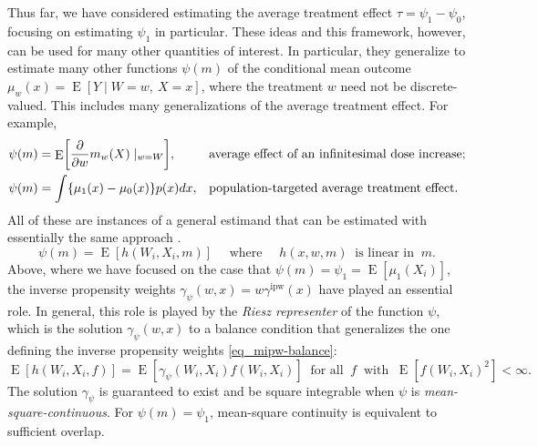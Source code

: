 \documentclass{article}
\DeclarePairedDelimiter\sqb{[}{]}
\theoremstyle{definition}
\DeclareMathOperator{\E}{E}
\newcommand{\ipw}{\text{ipw}}
\newcommand{\estimand}{\psi}
\newcommand{\gammaipw}{\ensuremath{\gamma^{\ipw}}}
\newcommand{\<}{\langle}
\renewcommand{\>}{\rangle}
\begin{document}
Thus far, we have considered estimating the average treatment effect $\tau = \psi_1 - \psi_0$, focusing on estimating $\psi_1$ in particular.
These ideas and this framework, however, can be used for many other quantities of interest.
In particular, they generalize
to estimate
many other functions $\estimand(m)$ of the conditional mean outcome $\mu_w(x) = \E[Y \mid W=w,\ X=x]$, where the treatment $w$ need not be discrete-valued. This includes many generalizations of the average treatment effect. For example,
\begin{align}
&\estimand(m) = \E\sqb*{\frac{\partial}{\partial w} m_{w} (X) \mid_{w=W} }, &&\text{average effect of an infinitesimal dose increase}; \\
&\estimand(m) = \int \{\mu_1(x) - \mu_0(x)\} p(x)dx, &&\text{population-targeted average treatment effect}. \label{eq:targeted-ate}
\end{align}
All of these are instances of a  general estimand that can be estimated with essentially the same approach
\citep[see, e.g,][]{chernozhukov2018biased, hirshberg2021augmented}.
\begin{equation}
\label{eq:amle-general}
\estimand(m) = \E[ h(W_i, X_i, m) ]  \quad \text{ where } \quad h(x,w,m) \ \text{ is linear in }\ m.
\end{equation}
Above, where we have focused on the case that $\estimand(m) = \psi_1 = \E[\mu_1(X_i)]$, the inverse propensity weights $\gamma_\estimand(w,x)=w\gammaipw(x)$ have played an essential role. In general, this role is played by the \emph{Riesz representer} of the function $\estimand$, which is the solution $\gamma_{\estimand}(w, x)$ to a balance condition that generalizes the one defining the inverse propensity weights \eqref{eq_mipw-balance}:
\begin{equation}
\label{eq:riesz-representer-general}
\E[h(W_i,X_i, f)] = \E[ \gamma_{\estimand}(W_i, X_i)f(W_i,X_i)] \ \text{ for all }\  f \ \text{ with }\ \E[ f(W_i, X_i)^2 ] < \infty.
\end{equation}
The solution $\gamma_\estimand$ is guaranteed to exist and be square integrable when $\estimand$ is \emph{mean-square-continuous}. For $\estimand(m)=\psi_1$, mean-square continuity is %
 equivalent to sufficient overlap.
\end{document}
